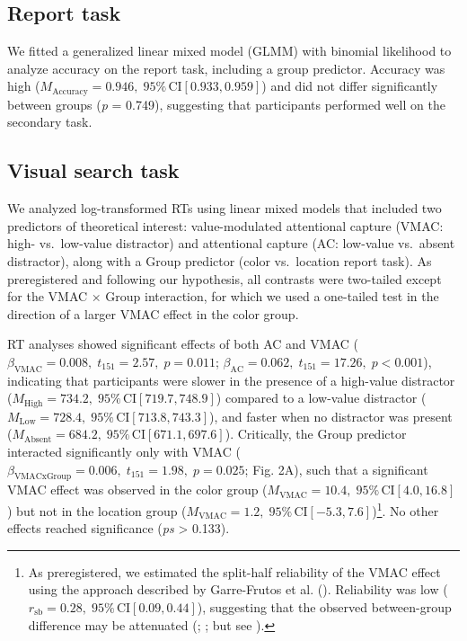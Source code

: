 \documentclass[
  jou,
  floatsintext,
  longtable,
  nolmodern,
  notxfonts,
  notimes,
  colorlinks=true,linkcolor=blue,citecolor=blue,urlcolor=blue]{apa7}
\begin{document}
\subsection{Report task}\label{report-task}

We fitted a generalized linear mixed model (GLMM) with binomial
likelihood to analyze accuracy on the report task, including a group
predictor. Accuracy was high
(\(M_{\text{Accuracy}} = 0.946, \;95\%\,\text{CI}[0.933, 0.959]\)) and
did not differ significantly between groups (\emph{p} = 0.749),
suggesting that participants performed well on the secondary task.

\subsection{Visual search task}\label{visual-search-task}

We analyzed log-transformed RTs using linear mixed models that included
two predictors of theoretical interest: value-modulated attentional
capture (VMAC: high- vs.~low-value distractor) and attentional capture
(AC: low-value vs.~absent distractor), along with a Group predictor
(color vs.~location report task). As preregistered and following our
hypothesis, all contrasts were two-tailed except for the VMAC × Group
interaction, for which we used a one-tailed test in the direction of a
larger VMAC effect in the color group.

RT analyses showed significant effects of both AC and VMAC
(\(\beta_{\mathrm{VMAC}} = 0.008, \; t_{151} = 2.57, \; p = 0.011\);
\(\beta_{\mathrm{AC}} = 0.062, \; t_{151} = 17.26, \; p < 0.001\)),
indicating that participants were slower in the presence of a high-value
distractor
(\(M_{\mathrm{High}} = 734.2,\;95\%\,\mathrm{CI}[719.7, 748.9]\))
compared to a low-value distractor
(\(M_{\mathrm{Low}} = 728.4,\;95\%\,\mathrm{CI}[713.8, 743.3]\)), and
faster when no distractor was present
(\(M_{\mathrm{Absent}} = 684.2,\;95\%\,\mathrm{CI}[671.1, 697.6]\)).
Critically, the Group predictor interacted significantly only with VMAC
(\(\beta_{\mathrm{VMAC x Group}} = 0.006, \; t_{151} = 1.98, \; p = 0.025\);
Fig. 2A), such that a significant VMAC effect was observed in the color
group (\(M_{\mathrm{VMAC}} = 10.4,\;95\%\,\mathrm{CI}[4.0, 16.8]\)) but
not in the location group
(\(M_{\mathrm{VMAC}} = 1.2,\;95\%\,\mathrm{CI}[-5.3, 7.6]\))\footnote{As
  preregistered, we estimated the split-half reliability of the VMAC
  effect using the approach described by Garre-Frutos et al.
  (). Reliability was low
  (\(r_{\text{sb}} = 0.28, \;95\%\,\text{CI}[0.09, 0.44]\)), suggesting
  that the observed between-group difference may be attenuated
  (;
  ; but see
  ).}. No other effects reached
significance (\emph{ps} \textgreater{} 0.133).
\end{document}
